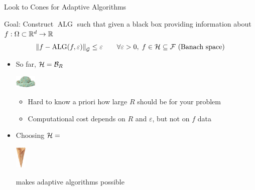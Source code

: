 \documentclass[10pt,compress,xcolor={usenames,dvipsnames},aspectratio=169]{beamer}
\DeclareMathOperator{\alg}{ALG}
\newcommand{\scoop}[1]{\parbox{#1}{\includegraphics[width=#1]{IceCreamScoop.eps}}\xspace}
\newcommand{\smallscoop}{\scoop{1cm}}
\newcommand{\smallcone}{\parbox{1.1cm}{\includegraphics[width=0.5cm,angle=270]{MediumWaffleCone.eps}}\xspace}
\begin{document}
\begin{frame}{Look to Cones for Adaptive Algorithms}

\vspace{-4ex}
\alert{Goal:} Construct $\alg$  such that given a \alert{black box} providing information about $f: \Omega \subset \mathbb{R}^d \to \mathbb{R}$
\begin{equation*}
    \norm[\cg]{f - \alg(f,\varepsilon)} \le \varepsilon \qquad \forall \varepsilon > 0, \; f \in \ch \subseteq \cf \text{ (Banach space)}
\end{equation*}

\vspace{-5ex}

\begin{itemize}
    \item So far, $\mathcal{H} = \mathcal{B}_R$ \smallscoop
    \begin{itemize}
	[triangle]
        \item Hard to know a priori how large $R$ should be for your problem
        \item Computational cost depends on $R$ and $\varepsilon$, but not on $f$ data
    \end{itemize}
    
    \item Choosing $\mathcal{H} = $ \smallcone makes adaptive algorithms possible

\end{itemize}
\end{frame}
\end{document}
